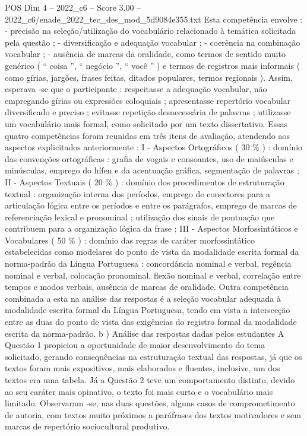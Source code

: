 \begin{textsample}{POS Dim 4 – 2022\_c6 – Score 3.00 – 2022\_c6/enade\_2022\_tec\_des\_mod\_5d9084e355.txt}
Esta competência envolve : - precisão na seleção/utilização do vocabulário relacionado à temática solicitada pela questão ; - diversificação e adequação vocabular ; - coerência na combinação vocabular ; - ausência de marcas da oralidade, como termos de sentido muito genérico ( “ coisa ”, “ negócio ”, “ você ” ) e termos de registros mais informais ( como gírias, jargões, frases feitas, ditados populares, termos regionais ).
Assim, esperava -se que o participante : respeitasse a adequação vocabular, não empregando gírias ou expressões coloquiais ; apresentasse repertório vocabular diversificado e preciso ; evitasse repetição desnecessária de palavras ; utilizasse um vocabulário mais formal, como solicitado por um texto dissertativo.
Essas quatro competências foram reunidas em três itens de avaliação, atendendo aos aspectos explicitados anteriormente : I - Aspectos Ortográficos ( 30 \% ) : domínio das convenções ortográficas : grafia de vogais e consoantes, uso de maiúsculas e minúsculas, emprego do hífen e da acentuação gráfica, segmentação de palavras ; II - Aspectos Textuais ( 20 \% ) : domínio dos procedimentos de estruturação textual : organização interna dos períodos, emprego de conectores para a articulação lógica entre os períodos e entre os parágrafos, emprego de marcas de referenciação lexical e pronominal ; utilização dos sinais de pontuação que contribuem para a organização lógica da frase ; III - Aspectos Morfossintáticos e Vocabulares ( 50 \% ) : domínio das regras de caráter morfossintático estabelecidas como modelares do ponto de vista da modalidade escrita formal da norma-padrão da Língua Portuguesa : concordância nominal e verbal, regência nominal e verbal, colocação pronominal, flexão nominal e verbal, correlação entre tempos e modos verbais, ausência de marcas de oralidade.
Outra competência combinada a esta na análise das respostas é a seleção vocabular adequada à modalidade escrita formal da Língua Portuguesa, tendo em vista a intersecção entre as duas do ponto de vista das exigências do registro formal da modalidade escrita da norma-padrão. b ) Análise das respostas dadas pelos estudantes A Questão 1 propiciou a oportunidade de maior desenvolvimento do tema solicitado, gerando consequências na estruturação textual das respostas, já que os textos foram mais expositivos, mais elaborados e fluentes, inclusive, um dos textos era uma tabela.
Já a Questão 2 teve um comportamento distinto, devido ao seu caráter mais opinativo, o texto foi mais curto e o vocabulário mais limitado.
Observaram -se, nas duas questões, alguns casos de comprometimento de autoria, com textos muito próximos a paráfrases dos textos motivadores e sem marcas de repertório sociocultural produtivo.

\end{textsample}
